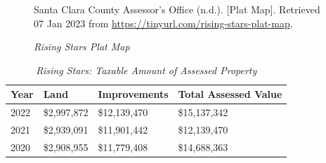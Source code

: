\begin{figure}[hbtp]
  \caption[Rising Stars Plat Map]{\textit{Rising Stars Plat Map}}%
  \label{fig:rising-stars-plat-map}
  {Santa Clara County Assessor's Office (n.d.). [Plat Map]. Retrieved 07 Jan 2023 from  \url{https://tinyurl.com/rising-stars-plat-map}.}
\end{figure}

\begin{table}[hbtp]
  \SingleSpacing%
  \caption[Rising Stars: Taxable Amount of Assessed Propery]{\textit{Rising Stars: Taxable Amount of Assessed Property}}%
  \label{tab:rising-stars-taxable-amount}
  \begin{tabular}{llll}
    \toprule
    Year & Land        & Improvements & Total Assessed Value \\
    \midrule
    2022 & \$2,997,872 & \$12,139,470 & \$15,137,342 \\
    2021 & \$2,939,091 & \$11,901,442 & \$12,139,470 \\
    2020 & \$2,908,955 & \$11,779,408 & \$14,688,363 \\
    \bottomrule
  \end{tabular}
\end{table}

